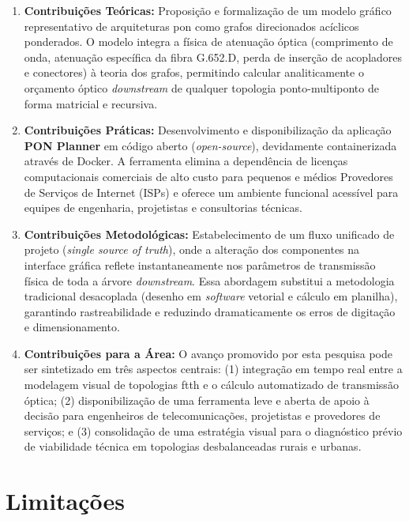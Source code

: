 \begin{enumerate}
    \item \textbf{Contribuições Teóricas:} Proposição e formalização de um modelo gráfico representativo de arquiteturas \gls{pon} como grafos direcionados acíclicos ponderados. O modelo integra a física de atenuação óptica (comprimento de onda, atenuação específica da fibra G.652.D, perda de inserção de acopladores e conectores) à teoria dos grafos, permitindo calcular analiticamente o orçamento óptico \textit{downstream} de qualquer topologia ponto-multiponto de forma matricial e recursiva.
    
    \item \textbf{Contribuições Práticas:} Desenvolvimento e disponibilização da aplicação \textbf{PON Planner} em código aberto (\textit{open-source}), devidamente containerizada através de Docker. A ferramenta elimina a dependência de licenças computacionais comerciais de alto custo para pequenos e médios Provedores de Serviços de Internet (ISPs) e oferece um ambiente funcional acessível para equipes de engenharia, projetistas e consultorias técnicas.
    
    \item \textbf{Contribuições Metodológicas:} Estabelecimento de um fluxo unificado de projeto (\textit{single source of truth}), onde a alteração dos componentes na interface gráfica reflete instantaneamente nos parâmetros de transmissão física de toda a árvore \textit{downstream}. Essa abordagem substitui a metodologia tradicional desacoplada (desenho em \textit{software} vetorial e cálculo em planilha), garantindo rastreabilidade e reduzindo dramaticamente os erros de digitação e dimensionamento.
    
    \item \textbf{Contribuições para a Área:} O avanço promovido por esta pesquisa pode ser sintetizado em três aspectos centrais: (1) integração em tempo real entre a modelagem visual de topologias \gls{ftth} e o cálculo automatizado de transmissão óptica; (2) disponibilização de uma ferramenta leve e aberta de apoio à decisão para engenheiros de telecomunicações, projetistas e provedores de serviços; e (3) consolidação de uma estratégia visual para o diagnóstico prévio de viabilidade técnica em topologias desbalanceadas rurais e urbanas.
\end{enumerate}

\section{Limitações}

